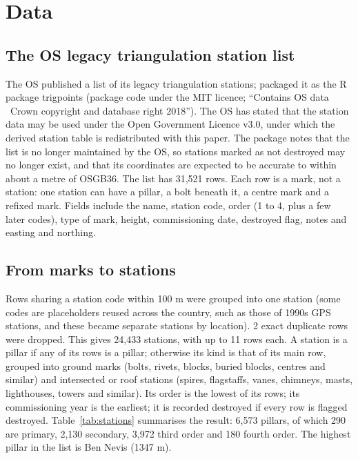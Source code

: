 \documentclass[11pt,a4paper]{article}
\begin{document}
\section{Data}\label{sec:data}
\subsection{The OS legacy triangulation station list}
The OS published a list of its legacy triangulation stations; \citet{jones2018} packaged it as the R package trigpoints (package code under the MIT licence; ``Contains OS data \textcopyright\ Crown copyright and database right 2018''). The OS has stated that the station data may be used under the Open Government Licence v3.0, under which the derived station table is redistributed with this paper. The package notes that the list is no longer maintained by the OS, so stations marked as not destroyed may no longer exist, and that its coordinates are expected to be accurate to within about a metre of OSGB36. The list has 31,521 rows. Each row is a mark, not a station: one station can have a pillar, a bolt beneath it, a centre mark and a refixed mark. Fields include the name, station code, order (1 to 4, plus a few later codes), type of mark, height, commissioning date, destroyed flag, notes and easting and northing.

\subsection{From marks to stations}
Rows sharing a station code within 100 m were grouped into one station (some codes are placeholders reused across the country, such as those of 1990s GPS stations, and these became separate stations by location). 2 exact duplicate rows were dropped. This gives 24,433 stations, with up to 11 rows each. A station is a pillar if any of its rows is a pillar; otherwise its kind is that of its main row, grouped into ground marks (bolts, rivets, blocks, buried blocks, centres and similar) and intersected or roof stations (spires, flagstaffs, vanes, chimneys, masts, lighthouses, towers and similar). Its order is the lowest of its rows; its commissioning year is the earliest; it is recorded destroyed if every row is flagged destroyed. Table~\ref{tab:stations} summarises the result: 6,573 pillars, of which 290 are primary, 2,130 secondary, 3,972 third order and 180 fourth order. The highest pillar in the list is Ben Nevis (1347 m).
\end{document}
